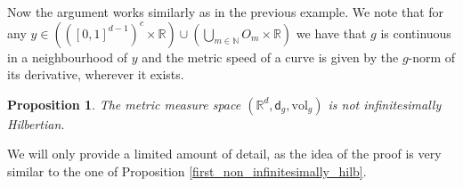 \documentclass[a4paper,10pt]{article}
\newtheorem{proposition}[theorem]{Proposition}
\numberwithin{equation}{section}
\newcommand{\R}{\mathbb{R}}
\newcommand{\N}{\mathbb{N}}
\newcommand{\vol}{\mathrm{vol}}
\newcommand{\sfd}{\mathsf d}
\begin{document}
Now the argument works similarly as in the previous example. 
We note that for any $y \in (([0,1]^{d-1})^c \times \R) \cup (\bigcup_{m \in \N}O_m \times \R)$ we have that $g$ is continuous in a neighbourhood of $y$ and the metric speed of a curve is given by the $g$-norm of its derivative, wherever it exists. 
\smallskip
\begin{proposition}
    The metric measure space $(\R^{d}, \sfd_g, \vol_g)$ is not infinitesimally Hilbertian. 
\end{proposition}
We will only provide a limited amount of detail, as the idea of the proof is very similar to the one of Proposition \ref{first_non_infinitesimally_hilb}.
\end{document}
